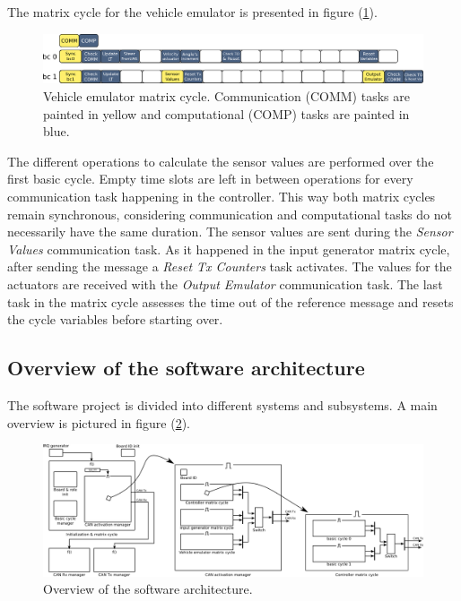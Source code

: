\documentclass[table,xcdraw]{article}
\begin{document}
The matrix cycle for the vehicle emulator is presented in figure (\ref{fig:vehicle_emulator_basic_cycle}).

\begin{figure}[h!]
    \centering
    \includegraphics[width=\textwidth]{figures/methodology/vehicle_emulator_matrix_cycle.png}
    \caption{Vehicle emulator matrix cycle. Communication (COMM) tasks are painted in yellow and computational (COMP) tasks are painted in blue.}
    \label{fig:vehicle_emulator_basic_cycle}
\end{figure}

The different operations to calculate the sensor values are performed over the first basic cycle. Empty time slots are left in between operations for every communication task happening in the controller. This way both matrix cycles remain synchronous, considering communication and computational tasks do not necessarily have the same duration. The sensor values are sent during the \textit{Sensor Values} communication task. As it happened in the input generator matrix cycle, after sending the message a \textit{Reset Tx Counters} task activates. The values for the actuators are received with the \textit{Output Emulator} communication task. The last task in the matrix cycle assesses the time out of the reference message and resets the cycle variables before starting over.\\


\subsection{Overview of the software architecture} \label{sec:software_overview}
The software project is divided into different systems and subsystems. A main overview is pictured in figure (\ref{fig:software_overview}).\\

\begin{figure}[h!]
    \centering
    \includegraphics[width=\textwidth]{figures/methodology/software_overview.png}
    \caption{Overview of the software architecture.}
    \label{fig:software_overview}
\end{figure}
\end{document}
